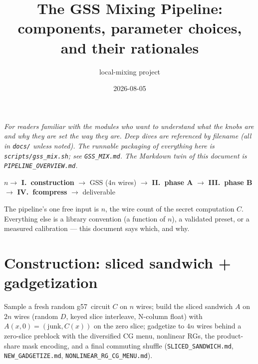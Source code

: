 \documentclass[11pt]{article}
\title{The GSS Mixing Pipeline:\\ \large components, parameter choices, and their rationales}
\author{local-mixing project}
\date{2026-08-05}
\newcommand{\g}{\textsf{g57}}
\newcommand{\doc}[1]{\texttt{#1}}
\begin{document}
\maketitle

\noindent\emph{For readers familiar with the modules who want to understand
what the knobs are and why they are set the way they are. Deep dives are
referenced by filename (all in \doc{docs/} unless noted). The runnable
packaging of everything here is \doc{scripts/gss\_mix.sh}; see
\doc{GSS\_MIX.md}. The Markdown twin of this document is
\doc{PIPELINE\_OVERVIEW.md}.}

\begin{center}
$n \rightarrow$ \textbf{I.~construction} $\rightarrow$ GSS ($4n$ wires)
$\rightarrow$ \textbf{II.~phase A} $\rightarrow$ \textbf{III.~phase B}
$\rightarrow$ \textbf{IV.~fcompress} $\rightarrow$ deliverable
\end{center}

The pipeline's one free input is $n$, the wire count of the secret
computation $C$. Everything else is a library convention (a function of
$n$), a validated preset, or a measured calibration --- this document says
which, and why.

\section{Construction: sliced sandwich + gadgetization}

Sample a fresh random \g\ circuit $C$ on $n$ wires; build the sliced
sandwich $A$ on $2n$ wires (random $D$, keyed slice interleave, N-column
float) with $A(x,0)=(\mathrm{junk}, C(x))$ on the zero slice; gadgetize to
$4n$ wires behind a zero-slice preblock with the diversified CG menu,
nonlinear RGs, the product-share mask encoding, and a final commuting
shuffle (\doc{SLICED\_SANDWICH.md}, \doc{NEW\_GADGETIZE.md},
\doc{NONLINEAR\_RG\_CG\_MENU.md}).
\end{document}
